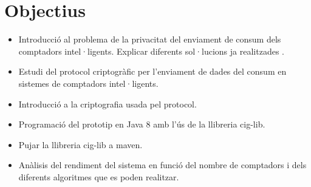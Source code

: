 \documentclass{article}
\begin{document}
	\section{Objectius}
	\begin{itemize}
		\item Introducció al problema de la privacitat del enviament de consum dels comptadors intel·ligents. Explicar diferents sol·lucions ja realitzades \cite{busom}.
		\item Estudi del protocol criptogràfic \cite{recsi} per l'enviament de dades del consum en sistemes de comptadors intel·ligents.
		\item Introducció a la criptografia usada pel protocol.  \cite{diffie-hellman} \cite{elgamal} \cite{kangaroo} \cite{pollard}
		\item Programació del prototip en Java 8 amb l'ús de la llibreria cig-lib. \cite{smart}
		\item Pujar la llibreria cig-lib a maven.
		\item Anàlisis del rendiment del sistema en funció del nombre de comptadors i dels diferents algoritmes que es poden realitzar.
	\end{itemize}
\end{document}
